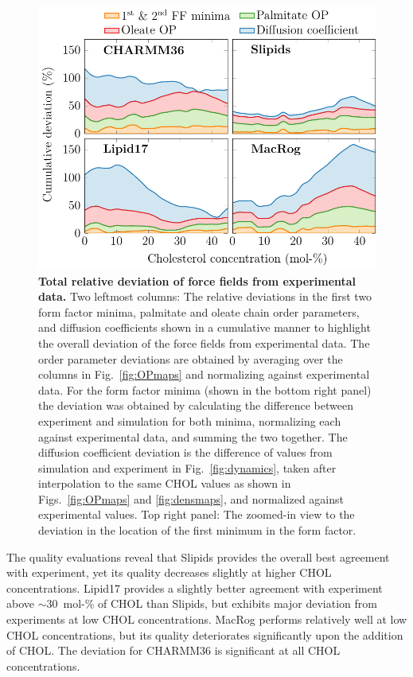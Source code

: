 \documentclass[journal=jctcce]{achemso}
\begin{document}
\begin{figure}[htb!]
  \centering
  \includegraphics[width=0.8\linewidth]{../FIGS/deviation.pdf}
  \caption{\label{fig:deviation}%
  \textbf{Total relative deviation of force fields from experimental data.} 
%
  Two leftmost columns:
  The relative deviations in the first two form factor minima, palmitate and oleate chain order parameters, and diffusion coefficients shown in a cumulative manner to highlight the overall deviation of the force fields from experimental data.
  The order parameter deviations are obtained by averaging over the columns in Fig.~\ref{fig:OPmaps} and normalizing against experimental data. For the form factor minima (shown in the bottom right panel) the deviation was obtained by calculating the difference between experiment and simulation for both minima, normalizing each against experimental data, and summing the two together. The diffusion coefficient deviation is the difference of values from simulation and experiment in Fig.~\ref{fig:dynamics}, taken after interpolation to the same CHOL values as shown in Figs.~\ref{fig:OPmaps} and \ref{fig:densmaps}, and normalized against experimental values.
%
  Top right panel: 
  The zoomed-in view to the deviation in the location of the first minimum in the form factor.
  }
\end{figure}

The quality evaluations reveal that Slipids provides the overall best agreement with experiment, yet its quality decreases slightly at higher CHOL concentrations. Lipid17 provides a slightly better agreement with experiment above $\sim$30~mol-\% of CHOL than Slipids, but exhibits major deviation from experiments at low CHOL concentrations. MacRog performs relatively well at low CHOL concentrations, but its quality deteriorates significantly upon the addition of CHOL. The deviation for CHARMM36 is significant at all CHOL concentrations. 
\end{document}
